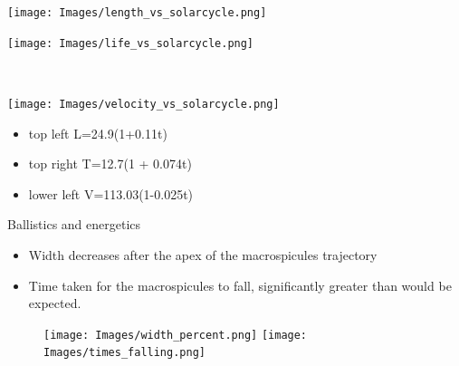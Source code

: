 \documentclass{beamer}
\begin{document}
	
	\begin{frame}
		\begin{minipage}{0.49\textwidth}
			\begin{flushleft}
				\texttt{[image: Images/length\_vs\_solarcycle.png]}
			\end{flushleft}
		\end{minipage}
		\begin{minipage}{0.49\textwidth}
			\begin{center}
				\texttt{[image: Images/life\_vs\_solarcycle.png]}
			\end{center}
		\end{minipage}\\
		\begin{minipage}{0.49\textwidth}
			\begin{flushright}
			\texttt{[image: Images/velocity\_vs\_solarcycle.png]}
			\end{flushright}
		\end{minipage}
		\begin{minipage}{0.49\textwidth}
			\begin{itemize}
				\small
				\item{top left L=24.9(1+0.11t)}
				\item{top right T=12.7(1 + 0.074t)}
				\item{lower left V=113.03(1-0.025t)}
			\end{itemize}
		\end{minipage}
	\end{frame}






	\begin{frame}{Ballistics and energetics}
		\begin{itemize}
			\item{Width decreases after the apex of the macrospicules trajectory}
			\item{Time taken for the macrospicules to fall, significantly greater than would be expected.}
		\end{itemize}
		
		\begin{figure}
			\centering
				\texttt{[image: Images/width\_percent.png]}
				\texttt{[image: Images/times\_falling.png]}
		\end{figure}
	\end{frame}
	
\end{document}
